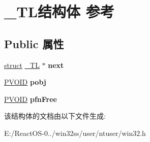\hypertarget{struct___t_l}{}\section{\+\_\+\+T\+L结构体 参考}
\label{struct___t_l}
\subsection*{Public 属性}
\begin{DoxyCompactItemize}
\item 
\mbox{\label{struct___t_l_a55a1ce1d73a108971631c253809169be}} 
\hyperlink{interfacestruct}{struct} \hyperlink{struct___t_l}{\+\_\+\+TL} $\ast$ {\bfseries next}
\item 
\mbox{\label{struct___t_l_a74bd996b6688638fb8ed86109bff34bb}} 
\hyperlink{interfacevoid}{P\+V\+O\+ID} {\bfseries pobj}
\item 
\mbox{\label{struct___t_l_aa3c2c7d1ae3248731f2c666bbd40ba79}} 
\hyperlink{interfacevoid}{P\+V\+O\+ID} {\bfseries pfn\+Free}
\end{DoxyCompactItemize}


该结构体的文档由以下文件生成\+:\begin{DoxyCompactItemize}
\item 
E\+:/\+React\+O\+S-\/0../win32ss/user/ntuser/win32.\+h\end{DoxyCompactItemize}
